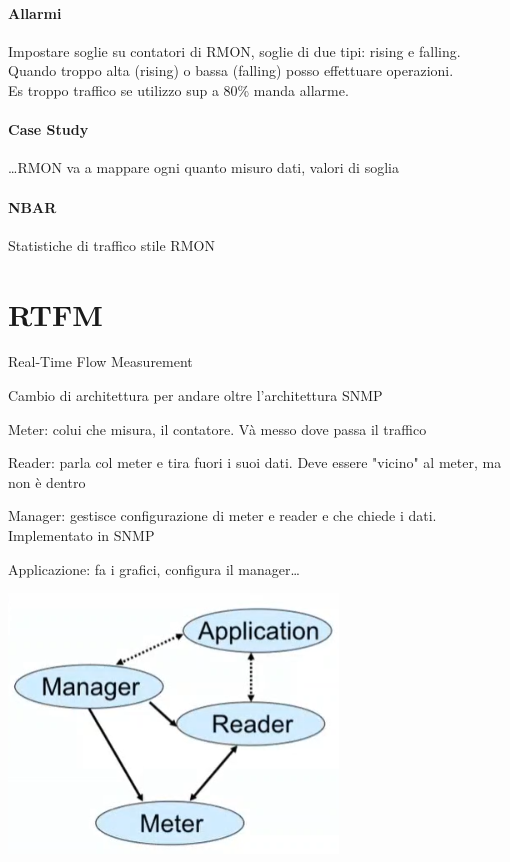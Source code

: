 \documentclass[10pt]{book}
\begin{document}
\paragraph{Allarmi} Impostare soglie su contatori di RMON, soglie di due tipi: rising e falling. Quando troppo alta (rising) o bassa (falling) posso effettuare operazioni.\\
Es troppo traffico se utilizzo sup a 80\% manda allarme.
\paragraph{Case Study} \ldots RMON va a mappare ogni quanto misuro dati, valori di soglia
\paragraph{NBAR} Statistiche di traffico stile RMON
\section{RTFM} Real-Time Flow Measurement
\begin{multicols}{2}
Cambio di architettura per andare oltre l'architettura SNMP
\begin{list}{}{}
	\item Meter: colui che misura, il contatore. Và messo dove passa il traffico
	\item Reader: parla col meter e tira fuori i suoi dati. Deve essere "vicino" al meter, ma non è dentro
	\item Manager: gestisce configurazione di meter e reader e che chiede i dati. Implementato in SNMP
	\item Applicazione: fa i grafici, configura il manager\ldots
\end{list}
\begin{center}
	\includegraphics[scale=0.5]{rtfm.png}
\end{center}
\end{multicols}
\end{document}
